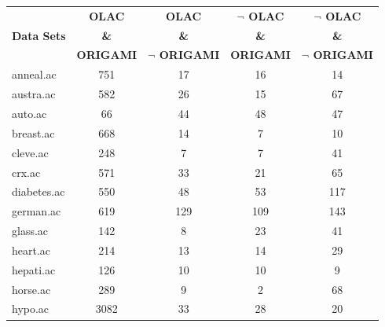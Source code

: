 \begin{table}[htbp]
	\centering
		\begin{tabular}{|l|c|c|c|c|}
		\hline
				& \textbf{OLAC}		& \textbf{OLAC}			& \textbf{$\neg$ OLAC}	& \textbf{$\neg$ OLAC}	\\
		\textbf{Data Sets}	& \textbf{\&}		& \textbf{\&}			& \textbf{\&}			& \textbf{\&}			\\
				& \textbf{ORIGAMI}	& \textbf{$\neg$ ORIGAMI}	& \textbf{ORIGAMI}		& \textbf{$\neg$ ORIGAMI}	\\
		\hline
		anneal.ac       & 751           & 17                 & 16                       & 14                            \\
		\hline
		austra.ac       & 582           & 26                 & 15                       & 67                            \\
		\hline
		auto.ac         & 66            & 44                 & 48                       & 47                            \\
		\hline
		breast.ac       & 668           & 14                 & 7                        & 10                            \\
		\hline
		cleve.ac        & 248           & 7                  & 7                        & 41                            \\
		\hline
		crx.ac          & 571           & 33                 & 21                       & 65                            \\
		\hline
		diabetes.ac     & 550           & 48                 & 53                       & 117                           \\
		\hline
		german.ac       & 619           & 129                & 109                      & 143                           \\
		\hline
		glass.ac        & 142           & 8                  & 23                       & 41                            \\
		\hline
		heart.ac        & 214           & 13                 & 14                       & 29                            \\
		\hline
		hepati.ac       & 126           & 10                 & 10                       & 9                             \\
		\hline
		horse.ac        & 289           & 9                  & 2                        & 68                            \\
		\hline
		hypo.ac         & 3082          & 33                 & 28                       & 20                            \\

\end{tabular}
\end{table}
